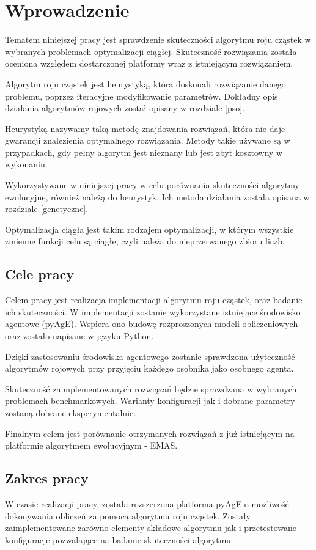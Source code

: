 \chapter{Wprowadzenie}
\label{cha:wstep}


Tematem niniejszej pracy jest sprawdzenie skuteczności algorytmu roju cząstek w wybranych problemach optymalizacji ciągłej. Skuteczność rozwiązania została oceniona względem dostarczonej platformy wraz z istniejącym rozwiązaniem.

Algorytm roju cząstek jest heurystyką, która doskonali rozwiązanie danego problemu, poprzez iteracyjne modyfikowanie parametrów. Dokładny opis działania algorytmów rojowych został opisany w rozdziale \ref{pso}.

Heurystyką nazywamy taką metodę znajdowania rozwiązań, która nie daje gwarancji znalezienia optymalnego rozwiązania. Metody takie używane są w przypadkach, gdy pełny algorytm jest nieznany lub jest zbyt kosztowny w wykonaniu.

Wykorzystywane w niniejszej pracy w celu porównania skuteczności algorytmy ewolucyjne, również należą do heurystyk. Ich metoda działania została opisana w rozdziale \ref{genetyczne}.

Optymalizacja ciągła jest takim rodzajem optymalizacji, w którym wszystkie zmienne funkcji celu są ciągłe, czyli należa do nieprzerwanego zbioru liczb.


\section{Cele pracy}
\label{sec:celePracy}
Celem pracy jest realizacja implementacji algorytmu roju cząstek, oraz badanie ich skuteczności. W implementacji zostanie wykorzystane istniejące środowisko agentowe (pyAgE). Wspiera ono budowę rozproszonych modeli obliczeniowych oraz zostało napisane w języku Python.

Dzięki zastosowaniu środowiska agentowego zostanie sprawdzona użyteczność algorytmów rojowych przy przyjęciu każdego osobnika jako osobnego agenta.

Skuteczność zaimplementowanych rozwiązań będzie sprawdzana w wybranych problemach benchmarkowych. Warianty konfiguracji jak i dobrane parametry zostaną dobrane eksperymentalnie. 

Finalnym celem jest porównanie otrzymanych rozwiązań z już istniejącym na platformie algorytmem ewolucyjnym - EMAS.


\section{Zakres pracy}
W czasie realizacji pracy, została rozszerzona platforma pyAgE o możliwość dokonywania obliczeń za pomocą algorytmu roju cząstek. Zostały zaimplementowane zarówno elementy składowe algorytmu jak i przetestowane konfiguracje pozwalające na badanie skuteczności algorytmu. 


